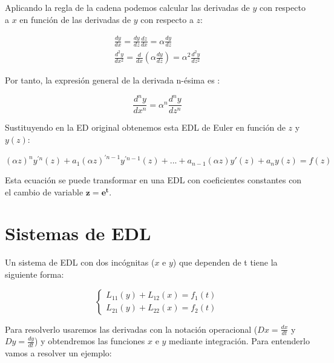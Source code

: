 \documentclass[a4paper,12pt,titlepage]{article}
\begin{document}
\par Aplicando la regla de la cadena podemos calcular las derivadas de $y$ con respecto a $x$ en función de las derivadas de $y$ con respecto a $z$:

\begin{equation}
    \begin{gathered}
        \frac{dy}{dx} = \frac{dy}{dz} \frac{dz}{dx} = \alpha \frac{dy}{dz} \\
        \frac{d^2y}{dx^2} = \frac{d}{dx} (\alpha \frac{dy}{dz}) = \alpha^2 \frac{d^2 y}{dz^2}
    \end{gathered}
\end{equation}

Por tanto, la expresión general de la derivada n-ésima es :

\begin{equation}
    \frac{d^n y}{dx^n} = \alpha^n \frac{d^n y}{dz^n}
\end{equation}

Sustituyendo en la ED original obtenemos esta EDL de Euler en función de $z$ y $y(z)$:

\begin{equation}
    (\alpha z)^n y^{'n}(z) + a_1(\alpha z)^{'n-1}y^{'n-1}(z) + ... + a_{n-1}(\alpha z)y'(z) + a_ny(z) = f(z)
\end{equation}

Esta ecuación se puede transformar en una EDL con coeficientes constantes con el cambio de variable $\mathbf{z = e^t}$.

\section{Sistemas de EDL}

Un sistema de EDL con dos incógnitas ($x$ e $y$) que dependen de t tiene la siguiente forma:

\begin{equation}
    \left\{ \begin{array}{l}
        L_{11}(y) + L_{12}(x) = f_1(t) \\
        L_{21}(y) + L_{22}(x) = f_2(t)
    \end{array}
    \right.
\end{equation}

Para resolverlo usaremos las derivadas con la notación operacional ($Dx = \frac{dx}{dt}$ y $Dy = \frac{dy}{dt}$) y obtendremos las funciones $x$ e $y$ mediante integración. Para entenderlo vamos a resolver un ejemplo:
\end{document}
